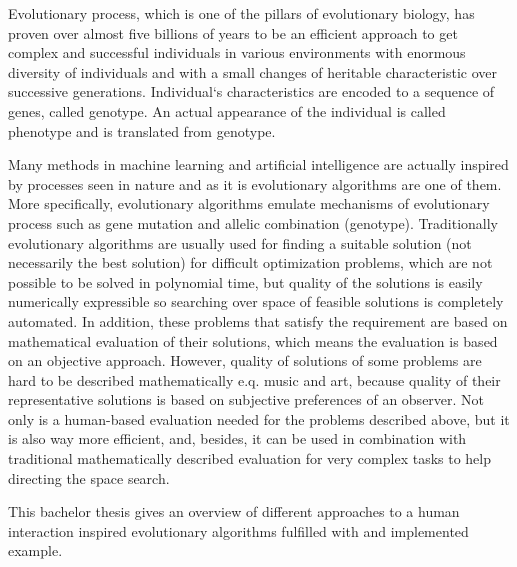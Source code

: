 \label{Introduction}
Evolutionary process, which is one of the pillars of evolutionary biology, has proven over almost five billions of years to be an efficient approach to get complex and successful individuals in various environments with enormous diversity of individuals and with a small changes of heritable characteristic over successive generations. Individual`s characteristics are encoded to a sequence of genes, called genotype. An actual appearance of the individual is called phenotype and is translated from genotype.

Many methods in machine learning and artificial intelligence are actually inspired by processes seen in nature and as it is evolutionary algorithms are one of them. More specifically, evolutionary algorithms emulate mechanisms of evolutionary process such as gene mutation and allelic combination (genotype). Traditionally evolutionary algorithms are usually used for finding a suitable solution (not necessarily the best solution) for difficult optimization problems, which are not possible to be solved in polynomial time, but quality of the solutions is easily numerically expressible so searching over space of feasible solutions is completely automated. In addition, these problems that satisfy the requirement are based on mathematical evaluation of their solutions, which means the evaluation is based on an objective approach. However, quality of solutions of some problems are hard to be described mathematically e.q. music and art, because quality of their representative solutions is based on subjective preferences of an observer. Not only is a human-based evaluation needed for the problems described above, but it is also way more efficient, and, besides, it can be used in combination with traditional mathematically described evaluation for very complex tasks to help directing the space search.

This bachelor thesis gives an overview of different approaches to a human interaction inspired evolutionary algorithms fulfilled with and implemented example.
